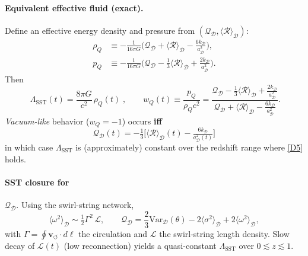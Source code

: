 \documentclass[10pt,reprint,aps,onecolumn,nofootinbib]{revtex4-2}
\newcommand{\vswirl}{\mathbf{v}_{\!\boldsymbol{\circlearrowleft}}}
\begin{document}
\paragraph{Equivalent effective fluid (exact).}
    Define an effective energy density and pressure from $(\mathcal{Q}_\mathcal{D},\langle \mathcal{R} \rangle_\mathcal{D})$:
    \begin{align}
        \rho_{Q} &\equiv -\frac{1}{16\pi G}\Big(\mathcal{Q}_\mathcal{D}+\langle \mathcal{R}\rangle_\mathcal{D}
        - \tfrac{6k_\mathcal{D}}{a_\mathcal{D}^{2}}\Big), \tag{D2}\label{D2}\\
        p_{Q} &\equiv -\frac{1}{16\pi G}\Big(\mathcal{Q}_\mathcal{D}-\tfrac{1}{3}\langle \mathcal{R}\rangle_\mathcal{D}
        + \tfrac{2k_\mathcal{D}}{a_\mathcal{D}^{2}}\Big). \tag{D3}\label{D3}
    \end{align}
    Then
    \[
        \boxed{\;
        \Lambda_{\!\mathrm{SST}}(t)=\frac{8\pi G}{c^2}\,\rho_{Q}(t)
            \;},\qquad
        w_Q(t)\equiv\frac{p_Q}{\rho_Q c^2}
        =\frac{\mathcal{Q}_\mathcal{D}-\tfrac{1}{3}\langle \mathcal{R}\rangle_\mathcal{D}
        +\tfrac{2k_\mathcal{D}}{a_\mathcal{D}^{2}}}
        {\mathcal{Q}_\mathcal{D}+\langle \mathcal{R}\rangle_\mathcal{D}
        -\tfrac{6k_\mathcal{D}}{a_\mathcal{D}^{2}}}.
        \tag{D4}\label{D4}
    \]
    \emph{Vacuum-like} behavior ($w_Q=-1$) occurs \textbf{iff}
    \[
        \boxed{\;\mathcal{Q}_\mathcal{D}(t)= -\tfrac{1}{3}\Big[\langle \mathcal{R}\rangle_\mathcal{D}(t)-\tfrac{6k_\mathcal{D}}{a_\mathcal{D}^{2}(t)}\Big]\;}
        \tag{D5}\label{D5}
    \]
    in which case $\Lambda_{\!\mathrm{SST}}$ is (approximately) constant over the redshift range where \eqref{D5} holds.

\paragraph{SST closure for }\(\mathcal{Q}_\mathcal{D}\).
    Using the swirl-string network,
    \[
        \langle \omega^2 \rangle_\mathcal{D} \sim \tfrac{1}{2}\Gamma^{2}\,\mathcal{L},\qquad
        \mathcal{Q}_\mathcal{D}=\frac{2}{3}\mathrm{Var}_\mathcal{D}(\theta)
        -2\langle \sigma^2\rangle_\mathcal{D}+2\langle \omega^2\rangle_\mathcal{D},
    \]
    with $\Gamma=\oint \vswirl\!\cdot d\boldsymbol{\ell}$ the circulation and
    $\mathcal{L}$ the swirl-string length density. Slow decay of $\mathcal{L}(t)$ (low reconnection) yields a quasi-constant $\Lambda_{\!\mathrm{SST}}$ over $0\lesssim z\lesssim 1$.
\end{document}
